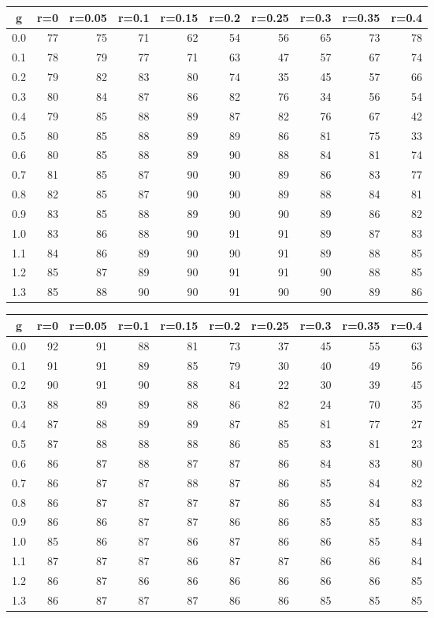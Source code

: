 %
\begin{table}[!tbp]
 \begin{center}
 \begin{tabular}{rrrrrrrrrr}\hline\hline
\multicolumn{1}{c}{g}&\multicolumn{1}{c}{r=0}&\multicolumn{1}{c}{r=0.05}&\multicolumn{1}{c}{r=0.1}&\multicolumn{1}{c}{r=0.15}&\multicolumn{1}{c}{r=0.2}&\multicolumn{1}{c}{r=0.25}&\multicolumn{1}{c}{r=0.3}&\multicolumn{1}{c}{r=0.35}&\multicolumn{1}{c}{r=0.4}\tabularnewline
\hline
0.0&77&75&71&62&54&56&65&73&78\tabularnewline
0.1&78&79&77&71&63&47&57&67&74\tabularnewline
0.2&79&82&83&80&74&35&45&57&66\tabularnewline
0.3&80&84&87&86&82&76&34&56&54\tabularnewline
0.4&79&85&88&89&87&82&76&67&42\tabularnewline
0.5&80&85&88&89&89&86&81&75&33\tabularnewline
0.6&80&85&88&89&90&88&84&81&74\tabularnewline
0.7&81&85&87&90&90&89&86&83&77\tabularnewline
0.8&82&85&87&90&90&89&88&84&81\tabularnewline
0.9&83&85&88&89&90&90&89&86&82\tabularnewline
1.0&83&86&88&90&91&91&89&87&83\tabularnewline
1.1&84&86&89&90&90&91&89&88&85\tabularnewline
1.2&85&87&89&90&91&91&90&88&85\tabularnewline
1.3&85&88&90&90&91&90&90&89&86\tabularnewline
\hline
\end{tabular}

\end{center}

\end{table}

%
\begin{table}[!tbp]
 \begin{center}
 \begin{tabular}{rrrrrrrrrr}\hline\hline
\multicolumn{1}{c}{g}&\multicolumn{1}{c}{r=0}&\multicolumn{1}{c}{r=0.05}&\multicolumn{1}{c}{r=0.1}&\multicolumn{1}{c}{r=0.15}&\multicolumn{1}{c}{r=0.2}&\multicolumn{1}{c}{r=0.25}&\multicolumn{1}{c}{r=0.3}&\multicolumn{1}{c}{r=0.35}&\multicolumn{1}{c}{r=0.4}\tabularnewline
\hline
0.0&92&91&88&81&73&37&45&55&63\tabularnewline
0.1&91&91&89&85&79&30&40&49&56\tabularnewline
0.2&90&91&90&88&84&22&30&39&45\tabularnewline
0.3&88&89&89&88&86&82&24&70&35\tabularnewline
0.4&87&88&89&89&87&85&81&77&27\tabularnewline
0.5&87&88&88&88&86&85&83&81&23\tabularnewline
0.6&86&87&88&87&87&86&84&83&80\tabularnewline
0.7&86&87&87&88&87&86&85&84&82\tabularnewline
0.8&86&87&87&87&87&86&85&84&83\tabularnewline
0.9&86&86&87&87&86&86&85&85&83\tabularnewline
1.0&85&86&87&86&87&86&86&85&84\tabularnewline
1.1&87&87&87&86&87&87&86&86&84\tabularnewline
1.2&86&87&86&86&86&86&86&86&85\tabularnewline
1.3&86&87&87&87&86&86&85&85&85\tabularnewline
\hline
\end{tabular}

\end{center}

\end{table}

